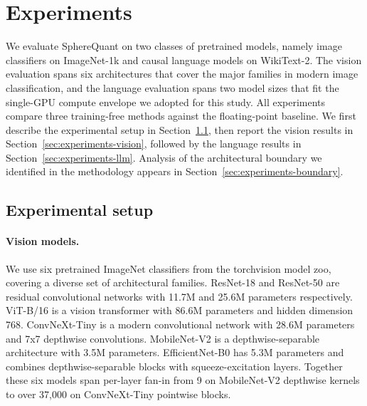 
\section{Experiments}
\label{sec:experiments}

We evaluate SphereQuant on two classes of pretrained models, namely image
classifiers on ImageNet-1k and causal language models on WikiText-2.
The vision evaluation spans six architectures that cover the major
families in modern image classification, and the language evaluation
spans two model sizes that fit the single-GPU compute envelope we
adopted for this study. All experiments compare three training-free
methods against the floating-point baseline. We first describe the
experimental setup in Section~\ref{sec:experiments-setup}, then report
the vision results in Section~\ref{sec:experiments-vision}, followed by
the language results in Section~\ref{sec:experiments-llm}. Analysis of
the architectural boundary we identified in the methodology appears in
Section~\ref{sec:experiments-boundary}.

\subsection{Experimental setup}
\label{sec:experiments-setup}

\paragraph{Vision models.}
We use six pretrained ImageNet classifiers from the torchvision model
zoo, covering a diverse set of architectural families. ResNet-18 and
ResNet-50 \citep{he2016resnet} are residual convolutional networks
with 11.7M and 25.6M parameters respectively. ViT-B/16
\citep{dosovitskiy2021vit} is a vision transformer with 86.6M
parameters and hidden dimension 768. ConvNeXt-Tiny
\citep{liu2022convnext} is a modern convolutional network with 28.6M
parameters and 7x7 depthwise convolutions. MobileNet-V2
\citep{sandler2018mobilenetv2} is a depthwise-separable architecture
with 3.5M parameters. EfficientNet-B0 \citep{tan2019efficientnet} has
5.3M parameters and combines depthwise-separable blocks with
squeeze-excitation layers. Together these six models span per-layer
fan-in from 9 on MobileNet-V2 depthwise kernels to over 37,000 on
ConvNeXt-Tiny pointwise blocks.

